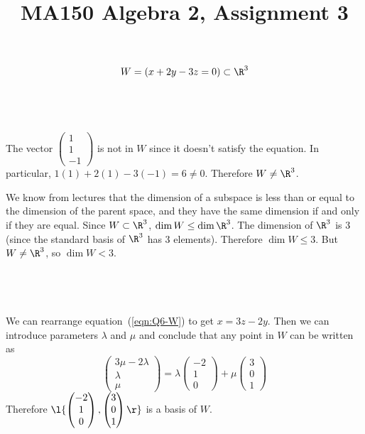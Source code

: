 \documentclass[a4paper]{article}
\title{MA150 Algebra 2, Assignment 3}
\begin{document}
\maketitle

\setlength{\parindent}{0em}
\setlength{\parskip}{1em}


\begin{equation}
W = (x + 2y - 3z = 0) \subset \R^3
\label{eqn:Q6-W}
\end{equation}

\subsection{~}

The vector $\begin{pmatrix}1\\ 1\\ -1\end{pmatrix}$ is not in $W$ since it doesn't satisfy the equation. In particular, $1(1) + 2(1) - 3(-1) = 6 \ne 0$. Therefore $W \ne \R^3$.

We know from lectures that the dimension of a subspace is less than or equal to the dimension of the parent space, and they have the same dimension if and only if they are equal. Since $W \subset \R^3$, $\dim W \le \dim \R^3$. The dimension of $\R^3$ is 3 (since the standard basis of $\R^3$ has 3 elements). Therefore $\dim W \le 3$. But $W \ne \R^3$, so $\dim W < 3$.

\subsection{~}

We can rearrange equation~(\ref{eqn:Q6-W}) to get $x = 3z - 2y$. Then we can introduce parameters $\lambda$ and $\mu$ and conclude that any point in $W$ can be written as $$\begin{pmatrix}3 \mu - 2 \lambda\\ \lambda\\ \mu\end{pmatrix} = \lambda \begin{pmatrix}-2\\ 1\\ 0\end{pmatrix} + \mu \begin{pmatrix}3\\ 0\\ 1\end{pmatrix}$$
Therefore $\l\{ \begin{pmatrix}- 2\\ 1\\ 0\end{pmatrix}, \begin{pmatrix}3\\ 0\\ 1\end{pmatrix} \r\}$ is a basis of $W$.
\end{document}
